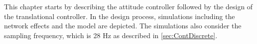
This chapter starts by describing the attitude controller followed by the design of the translational controller. In the design process, simulations including the network effects and the model are depicted. The simulations also consider the sampling frequency, which is 28 Hz as described in \autoref{sec:ContDiscrete}.